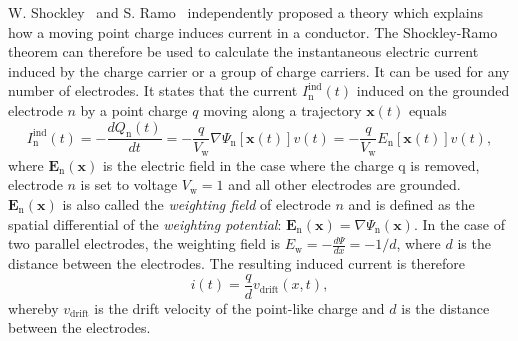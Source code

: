 W. Shockley~\cite{SHOCKLEY:00000} and S. Ramo~\cite{RAMO:00000} independently proposed a theory which explains how a moving point charge induces current in a conductor. The Shockley-Ramo theorem can therefore be used to calculate the instantaneous electric current induced by the charge carrier or a group of charge carriers. It can be used for any number of electrodes. It states that the current $I_\mathrm{n}^{\mathrm{ind}}(t)$ induced on the grounded electrode $n$ by a point charge $q$ moving along a trajectory $\textbf{x}(t)$ equals
\begin{equation}
\label{eq:ramo}
I_\mathrm{n}^{\mathrm{ind}}(t) = -\frac{dQ_\mathrm{n}(t)}{dt} =  -\frac{q}{V_\mathrm{w}}\nabla\Psi_\mathrm{n}[\textbf{x}(t)]v(t)  =  -\frac{q}{V_\mathrm{w}}E_\mathrm{n}[\textbf{x}(t)]v(t),
\end{equation}
where $\textbf{E}_\mathrm{n}(\textbf{x})$ is the electric field in the case where the charge q is removed, electrode $n$ is  set to voltage $V_\mathrm{w}=1$ and all other electrodes are grounded. $\textbf{E}_\mathrm{n}(\textbf{x})$ is also called the \emph{weighting field} of electrode $n$ and is defined as the spatial differential of the \emph{weighting potential}: $\textbf{E}_\mathrm{n}(\textbf{x})=\nabla \Psi_\mathrm{n}(\textbf{x})$. In the case of two parallel electrodes, the weighting field is $E_\mathrm{w} = -\frac{d\Psi}{dx} = -1/d$, where $d$ is the distance between the electrodes. The resulting induced current is therefore
\begin{equation}
\label{eq:ramoparallel}
i(t) = \frac{q}{d}v_\mathrm{drift}(x,t),
\end{equation} 
whereby $v_{\mathrm{drift}}$ is the drift velocity of the point-like charge and $d$ is the distance between the electrodes.








